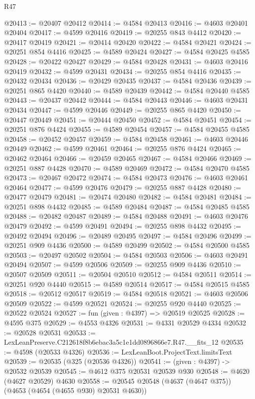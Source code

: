 \begin{lexlean}{R47}
\begin{coremodule}
@20413 := @20407 @20412
@20414 := @4584 @20413
@20416 := @4603 @20401 @20404
@20417 := @4599 @20416
@20419 := @20255 @843 @4412
@20420 := @20417 @20419
@20421 := @20414 @20420
@20422 := @4584 @20421
@20424 := @20251 @854 @4416
@20425 := @4589 @20424
@20427 := @4584 @20425 @4585
@20428 := @20422 @20427
@20429 := @4584 @20428
@20431 := @4603 @20416 @20419
@20432 := @4599 @20431
@20434 := @20255 @854 @4416
@20435 := @20432 @20434
@20436 := @20429 @20435
@20437 := @4584 @20436
@20439 := @20251 @865 @4420
@20440 := @4589 @20439
@20442 := @4584 @20440 @4585
@20443 := @20437 @20442
@20444 := @4584 @20443
@20446 := @4603 @20431 @20434
@20447 := @4599 @20446
@20449 := @20255 @865 @4420
@20450 := @20447 @20449
@20451 := @20444 @20450
@20452 := @4584 @20451
@20454 := @20251 @876 @4424
@20455 := @4589 @20454
@20457 := @4584 @20455 @4585
@20458 := @20452 @20457
@20459 := @4584 @20458
@20461 := @4603 @20446 @20449
@20462 := @4599 @20461
@20464 := @20255 @876 @4424
@20465 := @20462 @20464
@20466 := @20459 @20465
@20467 := @4584 @20466
@20469 := @20251 @887 @4428
@20470 := @4589 @20469
@20472 := @4584 @20470 @4585
@20473 := @20467 @20472
@20474 := @4584 @20473
@20476 := @4603 @20461 @20464
@20477 := @4599 @20476
@20479 := @20255 @887 @4428
@20480 := @20477 @20479
@20481 := @20474 @20480
@20482 := @4584 @20481
@20484 := @20251 @898 @4432
@20485 := @4589 @20484
@20487 := @4584 @20485 @4585
@20488 := @20482 @20487
@20489 := @4584 @20488
@20491 := @4603 @20476 @20479
@20492 := @4599 @20491
@20494 := @20255 @898 @4432
@20495 := @20492 @20494
@20496 := @20489 @20495
@20497 := @4584 @20496
@20499 := @20251 @909 @4436
@20500 := @4589 @20499
@20502 := @4584 @20500 @4585
@20503 := @20497 @20502
@20504 := @4584 @20503
@20506 := @4603 @20491 @20494
@20507 := @4599 @20506
@20509 := @20255 @909 @4436
@20510 := @20507 @20509
@20511 := @20504 @20510
@20512 := @4584 @20511
@20514 := @20251 @920 @4440
@20515 := @4589 @20514
@20517 := @4584 @20515 @4585
@20518 := @20512 @20517
@20519 := @4584 @20518
@20521 := @4603 @20506 @20509
@20522 := @4599 @20521
@20524 := @20255 @920 @4440
@20525 := @20522 @20524
@20527 := fun (given : @4397) => @20519 @20525
@20528 := @4595 @375
@20529 := @4553 @4326
@20531 := @4331 @20529 @4334
@20532 := @20528 @20531
@20533 := LexLeanPreserve.C212618f8b6ebac3a5c1e1dd0896866e7.R47.__fits_12
@20535 := @4598 (@20533 @4326)
@20536 := LexLeanBoot.ProjectText.limitsText
@20539 := @20535 (@325 (@20536 @4326))
@20541 := (given : @4397) -> @20532 @20539
@20545 := @4612 @375 @20531 @20539 @930
@20548 := @4620 (@4627 @20529) @4630
@20558 := @20545 @20548 (@4637 (@4647 @375)) (@4653 (@4654 (@4655 @930) @20531 @4630))

\end{coremodule}
\end{lexlean}
